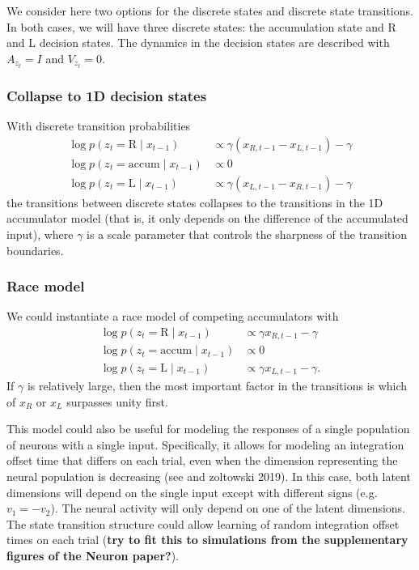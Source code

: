 \documentclass{article}
\begin{document}
We consider here two options for the discrete states and discrete state transitions. In both cases, we will have three discrete states: the accumulation state and R and L decision states. The dynamics in the decision states are described with $A_{z_t} = I$ and $V_{z_t} = 0$. 

\subsubsection{Collapse to 1D decision states}
With discrete transition probabilities 
\begin{align*}
\log p(z_t = \text{R} \mid x_{t-1}) &\propto \gamma (x_{R,t-1} - x_{L,t-1}) - \gamma \\
\log p(z_t = \text{accum} \mid x_{t-1}) &\propto 0 \\
\log p(z_t = \text{L} \mid x_{t-1}) &\propto \gamma (x_{L,t-1} - x_{R,t-1}) - \gamma 
\end{align*}
the transitions between discrete states collapses to the transitions in the 1D accumulator model (that is, it only depends on the difference of the accumulated input), where $\gamma$ is a scale parameter that controls the sharpness of the transition boundaries. 

\subsubsection{Race model}
We could instantiate a race model of competing accumulators \cite{gold2007neural} with 
\begin{align*}
\log p(z_t = \text{R} \mid x_{t-1}) &\propto \gamma x_{R,t-1} - \gamma \\
\log p(z_t = \text{accum} \mid x_{t-1}) &\propto 0 \\
\log p(z_t = \text{L} \mid x_{t-1}) &\propto \gamma x_{L,t-1} - \gamma.
\end{align*}
If $\gamma$ is relatively large, then the most important factor in the transitions is which of $x_R$ or $x_L$ surpasses unity first.

This model could also be useful for modeling the responses of a single population of neurons with a single input. Specifically, it allows for modeling an integration offset time that differs on each trial, even when the dimension representing the neural population is decreasing (see \cite{latimer2017no} and zoltowski 2019). In this case, both latent dimensions will depend on the single input except with different signs (e.g. $v_1 = - v_2$). The neural activity will only depend on one of the latent dimensions. The state transition structure could allow learning of random integration offset times on each trial (\textbf{try to fit this to simulations from the supplementary figures of the Neuron paper?}). 
\end{document}
